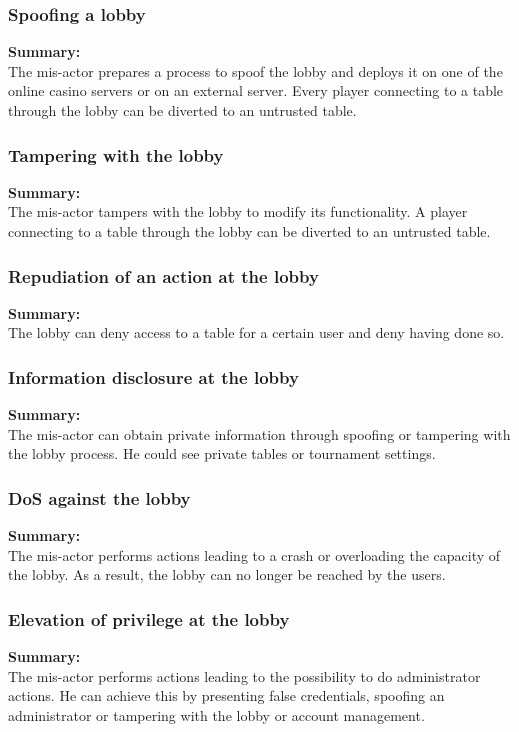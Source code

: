 \documentclass[a4paper,11pt]{report}
\begin{document}
\subsubsection{Spoofing a lobby}
\label{LobbyCasesS}
\textbf{Summary:} \\
The mis-actor prepares a process to spoof the lobby and deploys it on one of the online casino servers or on an external server. Every player connecting to a table through the lobby can be diverted to an untrusted table.
\subsubsection{Tampering with the lobby}
\label{LobbyCasesT}
\textbf{Summary:} \\
The mis-actor tampers with the lobby to modify its functionality. A player connecting to a table through the lobby can be diverted to an untrusted table. 
\subsubsection{Repudiation of an action at the lobby}
\label{LobbyCasesR}
\textbf{Summary:} \\
The lobby can deny access to a table for a certain user and deny having done so.

\subsubsection{Information disclosure at the lobby}
\label{LobbyCasesI}
\textbf{Summary:} \\
The mis-actor can obtain private information through spoofing or tampering with the lobby process. He could see private tables or tournament settings.

\subsubsection{DoS against the lobby}
\label{LobbyCasesD}
\textbf{Summary:} \\
The mis-actor performs actions leading to a crash or overloading the capacity of the lobby. As a result, the lobby can no longer be reached by the users.
\subsubsection{Elevation of privilege at the lobby}
\label{LobbyCasesE}
\textbf{Summary:} \\
The mis-actor performs actions leading to the possibility to do administrator actions. He can achieve this by presenting false credentials, spoofing an administrator or tampering with the lobby or account management.
\end{document}

